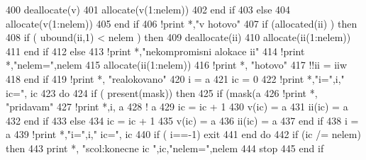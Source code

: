\begin{DoxyCode}
400                 \textcolor{keyword}{deallocate}(v)
401                 \textcolor{keyword}{allocate}(v(1:nelem))
402 \textcolor{keyword}{            end }if
403         else
404             \textcolor{keyword}{allocate}(v(1:nelem))
405 \textcolor{keyword}{        end }if
406         \textcolor{comment}{!print *,"v hotovo"
}
407         \textcolor{keywordflow}{if} (\textcolor{keyword}{allocated}(ii) ) then
408             \textcolor{keywordflow}{if} ( ubound(ii,1) < nelem ) then
409                 \textcolor{keyword}{deallocate}(ii)
410                 \textcolor{keyword}{allocate}(ii(1:nelem))
411 \textcolor{keyword}{            end }if
412         else
413             \textcolor{comment}{!print *,"nekompromisni alokace ii"
}
414             \textcolor{comment}{!print *,"nelem=",nelem
}
415             \textcolor{keyword}{allocate}(ii(1:nelem))
416             \textcolor{comment}{!print *, "hotovo"
}
417             \textcolor{comment}{!!ii = iiw
}
418 \textcolor{keyword}{        end }if
419         \textcolor{comment}{!print *, "realokovano"
}
420         i = a%
421         ic = 0
422         \textcolor{comment}{!print *,"i=",i," ic=", ic
}
423         do
424             \textcolor{keywordflow}{if} ( \textcolor{keyword}{present}(mask)) then
425                 \textcolor{keywordflow}{if} (mask(a%
426                     \textcolor{comment}{!print *, "pridavam"
}
427                     \textcolor{comment}{!print *,i, a%
}
428                     \textcolor{comment}{!    a%
}
429                     ic = ic + 1
430                     v(ic)  = a%
431                     ii(ic) = a%
432 \textcolor{keyword}{                end }if
433             else
434                 ic = ic + 1
435                 v(ic)  = a%
436                 ii(ic) = a%
437 \textcolor{keyword}{            end }if
438             i = a%
439             \textcolor{comment}{!print *,"i=",i," ic=", ic
}
440             \textcolor{keywordflow}{if} ( i==-1) exit
441 \textcolor{keyword}{        end }do
442         \textcolor{keywordflow}{if} (ic /= nelem) then
443             print *, \textcolor{stringliteral}{"scol:konecne ic "},ic,\textcolor{stringliteral}{"nelem="},nelem
444             stop
445 \textcolor{keyword}{        end }if
\end{DoxyCode}
